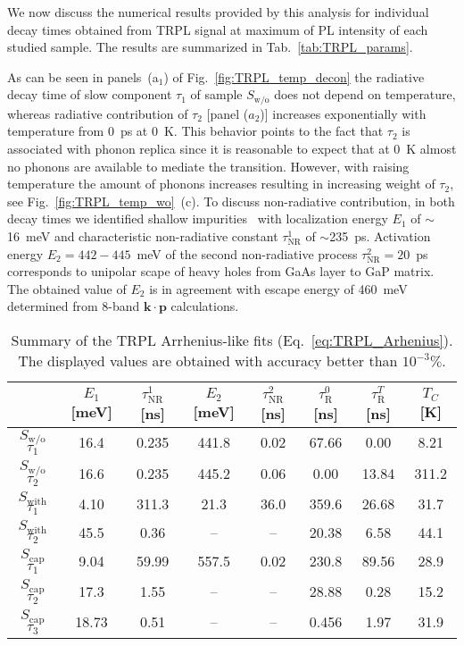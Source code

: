 {{{We now discuss the numerical results provided by this analysis for individual decay times obtained from TRPL signal at maximum of PL intensity of each studied sample. The results are summarized in Tab.~\ref{tab:TRPL_params}. 

As can be seen in panels~(a$_1$) of Fig.~\ref{fig:TRPL_temp_decon} the radiative decay time of slow component $\tau_1$ of sample $S_\mathrm{w/o}$ does not depend on temperature, whereas radiative contribution of $\tau_2$ [panel ($a_2$)] increases exponentially with temperature from 0~ps at 0~K. This behavior points to the fact that $\tau_2$ is associated with phonon replica since it is reasonable to expect that at 0~K almost no phonons are available to mediate the transition. However, with raising temperature the amount of phonons increases resulting in increasing weight of $\tau_2$, see Fig.~\ref{fig:TRPL_temp_wo}~(c). To discuss non-radiative contribution, in both decay times we identified shallow impurities~\citep{Cardona} with localization energy $E_1$ of $\sim$16~meV and characteristic non-radiative constant $\tau^1_\mathrm{NR}$ of $\sim$235~ps. Activation energy $E_2=442-445$~meV of the second non-radiative process $\tau^2_\mathrm{NR}=20$~ps corresponds to unipolar scape of heavy holes from GaAs layer to GaP matrix. The obtained value of $E_2$ is in agreement with escape energy of 460~meV determined from 8-band $\mathbf{k\cdot p}$ calculations.

\begin{table}
	\centering
	\caption{Summary of the TRPL Arrhenius-like fits (Eq.~\ref{eq:TRPL_Arhenius}). The displayed values are obtained with accuracy better than $10^{-3}\%$.}
	\begin{tabularx}{1\textwidth}{cCCCCCCC}
		\toprule
		
		& $E_1$ [meV]& $\tau_\mathrm{NR}^1$ [ns]& $E_2$ [meV]& $\tau_\mathrm{NR}^2$ [ns] & $\tau_\mathrm{R}^0$ [ns]& $\tau_\mathrm{R}^T$ [ns]& $T_C$ [K]\\ 	
		\midrule
		\midrule
		$S_\mathrm{w/o}$ $\tau_1$& 16.4&0.235&441.8 & 0.02& 67.66&0.00&8.21\\
		$S_\mathrm{w/o}$ $\tau_2$& 16.6&0.235&445.2 & 0.06& 0.00&13.84&311.2\\
		\midrule
		
		$S_\mathrm{with}$ $\tau_1$&4.10 & 311.3& 21.3&36.0& 359.6&26.68&31.7\\
		$S_\mathrm{with}$ $\tau_2$&45.5 & 0.36& --&--& 20.38&6.58&44.1\\
		\midrule
		
		$S_\mathrm{cap}$ $\tau_1$& 9.04&59.99&557.5 & 0.02& 230.8&89.56&28.9\\ %
		$S_\mathrm{cap}$ $\tau_2$& 17.3&1.55&-- & --& 28.88&0.28&15.2\\ %
		$S_\mathrm{cap}$ $\tau_3$& 18.73&0.51&-- & --& 0.456&1.97&31.9\\
		

\end{tabularx}
\end{table}}}}
